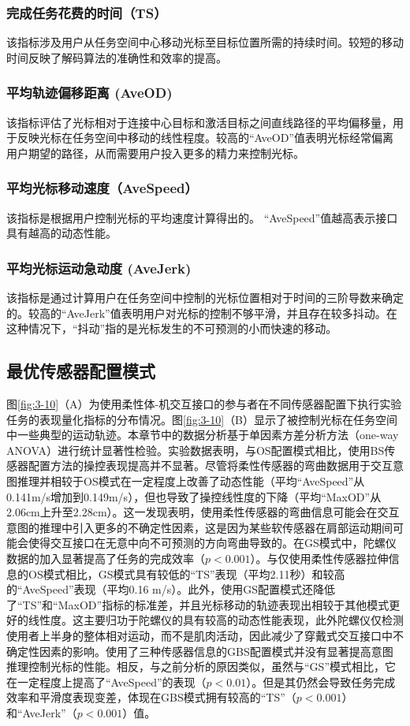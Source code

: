  \subsubsection{完成任务花费的时间（TS）}该指标涉及用户从任务空间中心移动光标至目标位置所需的持续时间。较短的移动时间反映了解码算法的准确性和效率的提高。
 \subsubsection{平均轨迹偏移距离 (AveOD)}该指标评估了光标相对于连接中心目标和激活目标之间直线路径的平均偏移量，用于反映光标在任务空间中移动的线性程度。较高的``AveOD''值表明光标经常偏离用户期望的路径，从而需要用户投入更多的精力来控制光标。
 \subsubsection{平均光标移动速度（AveSpeed）}该指标是根据用户控制光标的平均速度计算得出的。 “AveSpeed”值越高表示接口具有越高的动态性能。
 \subsubsection{平均光标运动急动度 (AveJerk) }该指标是通过计算用户在任务空间中控制的光标位置相对于时间的三阶导数来确定的。较高的``AveJerk''值表明用户对光标的控制不够平滑，并且存在较多抖动。在这种情况下，``抖动''指的是光标发生的不可预测的小而快速的移动。  

\subsection{最优传感器配置模式}图\ref{fig:3-10}（A）为使用柔性体-机交互接口的参与者在不同传感器配置下执行实验任务的表现量化指标的分布情况。图\ref{fig:3-10}（B）显示了被控制光标在任务空间中一些典型的运动轨迹。本章节中的数据分析基于单因素方差分析方法（one-way ANOVA）进行统计显著性检验。实验数据表明，与OS配置模式相比，使用BS传感器配置方法的操控表现提高并不显著。尽管将柔性传感器的弯曲数据用于交互意图推理并相较于OS模式在一定程度上改善了动态性能（平均``AveSpeed''从0.141m/s增加到0.149m/s），但也导致了操控线性度的下降（平均``MaxOD''从2.06cm上升至2.28cm）。这一发现表明，使用柔性传感器的弯曲信息可能会在交互意图的推理中引入更多的不确定性因素，这是因为某些软传感器在肩部运动期间可能会使得交互接口在无意中向不可预测的方向弯曲导致的。在GS模式中，陀螺仪数据的加入显著提高了任务的完成效率（$p<0.001$）。与仅使用柔性传感器拉伸信息的OS模式相比，GS模式具有较低的``TS''表现（平均2.11秒）和较高的``AveSpeed''表现（平均0.16 m/s）。此外，使用GS配置模式还降低了``TS''和``MaxOD''指标的标准差，并且光标移动的轨迹表现出相较于其他模式更好的线性度。这主要归功于陀螺仪的具有较高的动态性能表现，此外陀螺仪仅检测使用者上半身的整体相对运动，而不是肌肉活动，因此减少了穿戴式交互接口中不确定性因素的影响。使用了三种传感器信息的GBS配置模式并没有显著提高意图推理控制光标的性能。相反，与之前分析的原因类似，虽然与``GS''模式相比，它在一定程度上提高了``AveSpeed''的表现（$p<0.01$）。但是其仍然会导致任务完成效率和平滑度表现变差，体现在GBS模式拥有较高的``TS''（$p<0.001$）和``AveJerk''（$p<0.001$）值。

